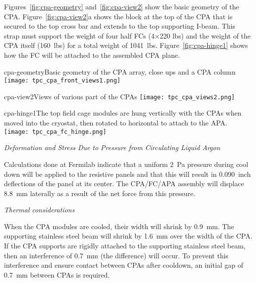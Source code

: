 
Figures~\ref{fig:cpa-geometry} and~\ref{fig:cpa-view2} show the basic geometry of the CPA. Figure~\ref{fig:cpa-view2}a shows the block at the top of the CPA that is secured to the top cross bar and extends to the top supporting I-beam.  This strap must support the weight of four half FCs (4$\times$220 lbs) and the weight of the CPA itself (160~lbs) for a total weight of 1041~lbs. Figure~\ref{fig:cpa-hinge1} shows how the FC will be attached to the assembled CPA plane. 

\begin{cdrfigure}{cpa-geometry}{Basic geometry of the CPA array, close ups and a CPA column} 
\texttt{[image: tpc\_cpa\_front\_views1.png]}
\end{cdrfigure}

\begin{cdrfigure}{cpa-view2}{Views of various part of the CPAs} 
\texttt{[image: tpc\_cpa\_views2.png]}
\end{cdrfigure}

\begin{cdrfigure}{cpa-hinge1}{The top field cage modules are hung vertically with the CPAs when moved into the cryostat, then rotated to horizontal to attach to the APA.} 
\texttt{[image: tpc\_cpa\_fc\_hinge.png]}
\end{cdrfigure}


{\it Deformation and Stress Due to Pressure from Circulating Liquid Argon}

Calculations done at Fermilab indicate that a uniform 2~Pa pressure during cool down will be applied to the resistive panels  and that this will result in 0.090~inch deflections of the panel at its center.  The CPA/FC/APA assembly will displace 8.8~mm laterally as a result of the net force from this pressure.  

{\it Thermal considerations}

When the CPA modules are cooled, their width will shrink by 0.9~mm.  The supporting stainless steel beam will shrink by 1.6~mm over the width of the CPA.  If the CPA supports are rigidly attached to the supporting stainless steel beam, then an interference of 0.7~mm (the difference) will occur.  To prevent this interference and ensure contact between CPAs after cooldown, an initial gap of 0.7~mm between CPAs is required.  

